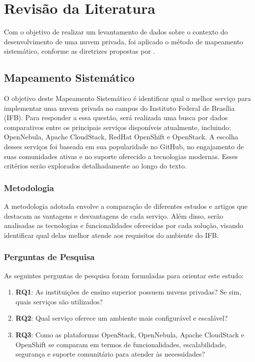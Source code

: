\chapter{Revisão da Literatura}

Com o objetivo de realizar um levantamento de dados sobre o contexto do desenvolvimento de uma nuvem privada, foi aplicado o método de mapeamento sistemático, conforme as diretrizes propostas por \cite{kitchenham2010systematic}.

\section{Mapeamento Sistemático}

O objetivo deste Mapeamento Sistemático é identificar qual o melhor serviço para implementar uma nuvem privada no campus do Instituto Federal de Brasília (IFB). Para responder a essa questão, será realizada uma busca por dados comparativos entre os principais serviços disponíveis atualmente, incluindo: OpenNebula, Apache CloudStack, RedHat OpenShift e OpenStack. A escolha desses serviços foi baseada em sua popularidade no GitHub, no engajamento de suas comunidades ativas e no suporte oferecido a tecnologias modernas. Esses critérios serão explorados detalhadamente ao longo do texto.

\subsection{Metodologia}

A metodologia adotada envolve a comparação de diferentes estudos e artigos que destacam as vantagens e desvantagens de cada serviço. Além disso, serão analisadas as tecnologias e funcionalidades oferecidas por cada solução, visando identificar qual delas melhor atende aos requisitos do ambiente do IFB.

\subsection{Perguntas de Pesquisa}

As seguintes perguntas de pesquisa foram formuladas para orientar este estudo:

\begin{enumerate}
    \item \textbf{RQ1}: As instituições de ensino superior possuem nuvens privadas? Se sim, quais serviços são utilizados?
    \item \textbf{RQ2}: Qual serviço oferece um ambiente mais configurável e escalável?
    \item \textbf{RQ3}: Como as plataformas OpenStack, OpenNebula, Apache CloudStack e OpenShift se comparam em termos de funcionalidades, escalabilidade, segurança e suporte comunitário para atender às necessidades?
\end{enumerate}

